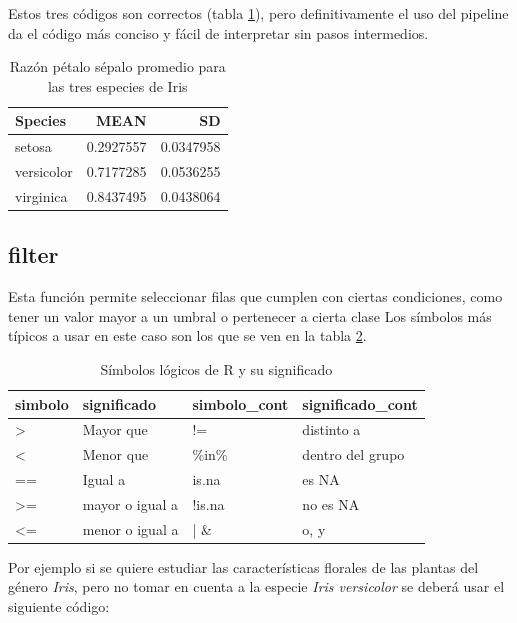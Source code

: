 \documentclass[]{book}
\begin{document}
Estos tres códigos son correctos (tabla \ref{tab:Pipe}), pero
definitivamente el uso del pipeline da el código más conciso y fácil de
interpretar sin pasos intermedios.

\begin{table}

\caption{\label{tab:Pipe}Razón pétalo sépalo promedio para las tres especies de Iris}
\centering
\begin{tabular}[t]{lrr}
\toprule
Species & MEAN & SD\\
\midrule
setosa & 0.2927557 & 0.0347958\\
versicolor & 0.7177285 & 0.0536255\\
virginica & 0.8437495 & 0.0438064\\
\bottomrule
\end{tabular}
\end{table}

\hypertarget{filter}{%
\subsection{filter}\label{filter}}

Esta función permite seleccionar filas que cumplen con ciertas
condiciones, como tener un valor mayor a un umbral o pertenecer a cierta
clase Los símbolos más típicos a usar en este caso son los que se ven en
la tabla \ref{tab:Logicas}.

\begin{table}

\caption{\label{tab:Logicas}Símbolos lógicos de R y su significado}
\centering
\begin{tabular}[t]{llll}
\toprule
simbolo & significado & simbolo\_cont & significado\_cont\\
\midrule
> & Mayor que & != & distinto a\\
< & Menor que & \%in\% & dentro del grupo\\
== & Igual a & is.na & es NA\\
>= & mayor o igual a & !is.na & no es NA\\
<= & menor o igual a & | \& & o, y\\
\bottomrule
\end{tabular}
\end{table}

Por ejemplo si se quiere estudiar las características florales de las
plantas del género \emph{Iris}, pero no tomar en cuenta a la especie
\emph{Iris versicolor} se deberá usar el siguiente código:
\end{document}
